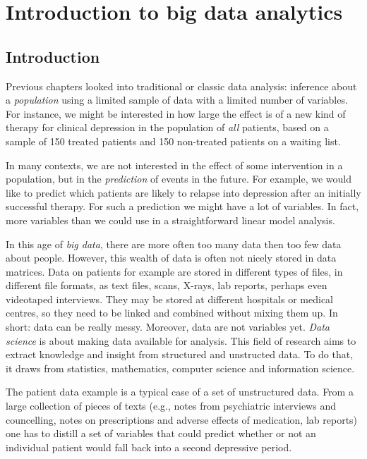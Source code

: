 \documentclass[]{book}\usepackage[]{graphicx}\usepackage[]{color}
\begin{document}



\chapter{Introduction to big data analytics}\label{chap:bda}

\section{Introduction}

Previous chapters looked into traditional or classic data analysis: inference about a \textit{population} using a limited sample of data with a limited number of variables. For instance, we might be interested in how large the effect is of a new kind of therapy for clinical depression in the population of \textit{all} patients, based on a sample of 150 treated patients and 150 non-treated patients on a waiting list.

In many contexts, we are not interested in the effect of some intervention in a population, but in the \textit{prediction} of events in the future. For example, we would like to predict which patients are likely to relapse into depression after an initially successful therapy. For such a prediction we might have a lot of variables. In fact, more variables than we could use in a straightforward linear model analysis. 

In this age of \textit{big data}, there are more often too many data then too few data about people. However, this wealth of data is often not nicely stored in data matrices. Data on patients for example are stored in different types of files, in different file formats, as text files, scans, X-rays, lab reports, perhaps even videotaped interviews. They may be stored at different hospitals or medical centres, so they need to be linked and combined without mixing them up. In short: data can be really messy. Moreover, data are not variables yet. \textit{Data science} is about making data available for analysis. This field of research aims to extract knowledge and insight from structured and unstructed data. To do that, it draws from statistics, mathematics, computer science and information science. 

The patient data example is a typical case of a set of unstructured data. From a large collection of pieces of texts (e.g., notes from psychiatric interviews and councelling, notes on prescriptions and adverse effects of medication, lab reports) one has to distill a set of variables that could predict whether or not an individual patient would fall back into a second depressive period.
\end{document}
